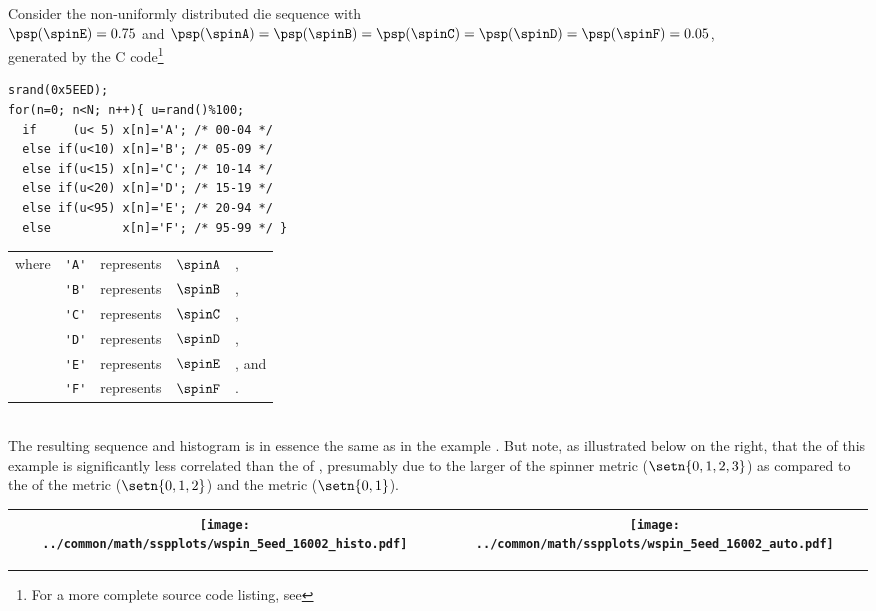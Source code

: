 \begin{example}
\label{ex:wspin_sha}
Consider the non-uniformly distributed die sequence with 
    \\\indentx$\psp(\spinE)=0.75$ and $\psp(\spinA)=\psp(\spinB)=\psp(\spinC)=\psp(\spinD)=\psp(\spinF)=0.05$,\\
    generated by the C code\footnote{For a more complete source code listing, see }
\\\begin{minipage}{85mm}%
\begin{lstlisting}
srand(0x5EED);
for(n=0; n<N; n++){ u=rand()%100;
  if     (u< 5) x[n]='A'; /* 00-04 */ 
  else if(u<10) x[n]='B'; /* 05-09 */ 
  else if(u<15) x[n]='C'; /* 10-14 */ 
  else if(u<20) x[n]='D'; /* 15-19 */ 
  else if(u<95) x[n]='E'; /* 20-94 */ 
  else          x[n]='F'; /* 95-99 */ }
\end{lstlisting}
\end{minipage}%
\hspace{10mm}%
\begin{tabular}{lclcl}
  where & \lstinline!'A'! &represents& $\spinA$ &,
     \\ & \lstinline!'B'! &represents& $\spinB$ &,
     \\ & \lstinline!'C'! &represents& $\spinC$ &,
     \\ & \lstinline!'D'! &represents& $\spinD$ &,
     \\ & \lstinline!'E'! &represents& $\spinE$ &, and
     \\ & \lstinline!'F'! &represents& $\spinF$ &.
\end{tabular}
\\
  The resulting sequence and histogram is in essence the same as in %
  the  example .
  But note, as illustrated below on the right, that the  of this example is 
  significantly less correlated than the  of ,
  presumably due to the larger   of the spinner metric ($\setn{0,1,2,3}$)
  as compared to the  of the  metric ($\setn{0,1,2}$) and 
  the  metric ($\setn{0,1}$).
     \\\begin{tabular}{|>{\scs}c|>{\scs}c|}
          \hline
          \texttt{[image: ../common/math/sspplots/wspin\_5eed\_16002\_histo.pdf]}%
         &\texttt{[image: ../common/math/sspplots/wspin\_5eed\_16002\_auto.pdf]}
        \\\hline
     \end{tabular}
\end{example}


